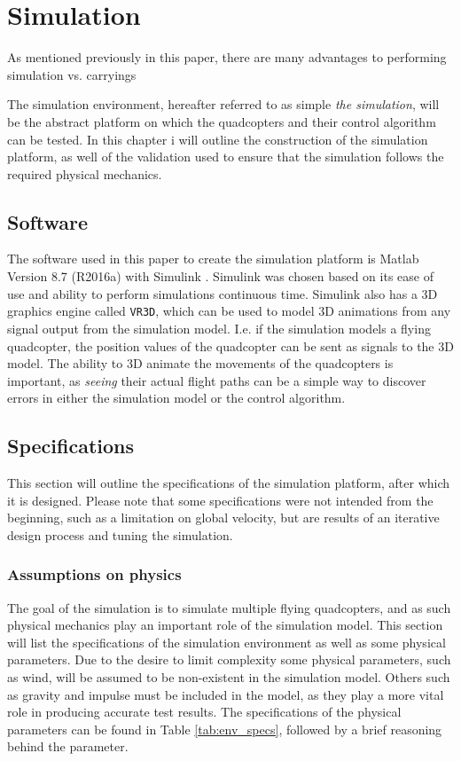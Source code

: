 
\chapter{Simulation}
\label{chap:simulation}
As mentioned previously in this paper, there are many advantages to performing simulation vs. carryings 


The simulation environment, hereafter referred to as simple \textit{the simulation}, will be the abstract platform on which the quadcopters and their control algorithm can be tested. 
In this chapter i will outline the construction of the simulation platform, as well of the validation used to ensure that the simulation follows the required physical mechanics. 

\section{Software}
The software used in this paper to create the simulation platform is Matlab Version 8.7 (R2016a) with Simulink \cite{_matlab_2016}. Simulink was chosen based on its ease of use and ability to perform simulations continuous time. Simulink also has a 3D graphics engine called \texttt{VR3D}\cite{_matlab_2016}, which can be used to model 3D animations from any signal output from the simulation model. I.e. if the simulation models a flying quadcopter, the position values of the quadcopter can be sent as signals to the 3D model. The ability to 3D animate the movements of the quadcopters is important, as \textit{seeing} their actual flight paths can be a simple way to discover errors in either the simulation model or the control algorithm. 

\section{Specifications}
\label{sec:physics}

This section will outline the specifications of the simulation platform, after which it is designed. Please note that some specifications were not intended from the beginning, such as a limitation on global velocity, but are results of an iterative design process and tuning the simulation. 

\subsection{Assumptions on physics}
\label{sec:physics}

The goal of the simulation is to simulate multiple flying quadcopters, and as such physical mechanics play an important role of the simulation model. This section will list the specifications of the simulation environment as well as some physical parameters. Due to the desire to limit complexity some physical parameters, such as wind, will be assumed to be non-existent in the simulation model. Others such as gravity and impulse must be included in the model, as they play a more vital role in producing accurate test results. The specifications of the physical parameters can be found in Table \ref{tab:env_specs}, followed by a brief reasoning behind the parameter.


